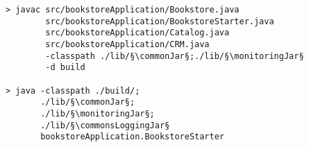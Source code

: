 \begin{lstlisting}[caption=Compile and run under Windows]
> javac src/bookstoreApplication/Bookstore.java 
        src/bookstoreApplication/BookstoreStarter.java 
        src/bookstoreApplication/Catalog.java 
        src/bookstoreApplication/CRM.java 
        -classpath ./lib/§\commonJar§;./lib/§\monitoringJar§
        -d build

> java -classpath ./build/;
       ./lib/§\commonJar§;
       ./lib/§\monitoringJar§;
       ./lib/§\commonsLoggingJar§
       bookstoreApplication.BookstoreStarter 
\end{lstlisting}
